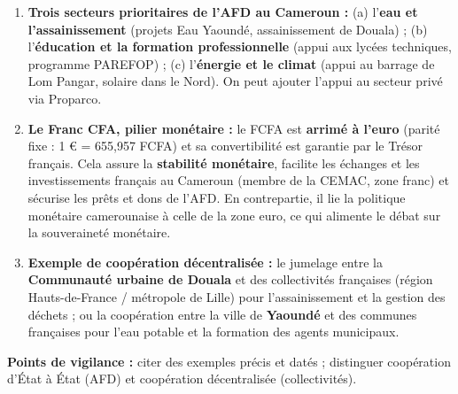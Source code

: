\documentclass[11pt]{article}
\begin{document}
\begin{corrige}
\begin{enumerate}
\item \textbf{Trois secteurs prioritaires de l'AFD au Cameroun :} (a) l'\textbf{eau et l'assainissement} (projets Eau Yaoundé, assainissement de Douala) ; (b) l'\textbf{éducation et la formation professionnelle} (appui aux lycées techniques, programme PAREFOP) ; (c) l'\textbf{énergie et le climat} (appui au barrage de Lom Pangar, solaire dans le Nord). On peut ajouter l'appui au secteur privé via Proparco.
\item \textbf{Le Franc CFA, pilier monétaire :} le FCFA est \textbf{arrimé à l'euro} (parité fixe : 1 \euro{} = 655,957 FCFA) et sa convertibilité est garantie par le Trésor français. Cela assure la \textbf{stabilité monétaire}, facilite les échanges et les investissements français au Cameroun (membre de la CEMAC, zone franc) et sécurise les prêts et dons de l'AFD. En contrepartie, il lie la politique monétaire camerounaise à celle de la zone euro, ce qui alimente le débat sur la souveraineté monétaire.
\item \textbf{Exemple de coopération décentralisée :} le jumelage entre la \textbf{Communauté urbaine de Douala} et des collectivités françaises (région Hauts-de-France / métropole de Lille) pour l'assainissement et la gestion des déchets ; ou la coopération entre la ville de \textbf{Yaoundé} et des communes françaises pour l'eau potable et la formation des agents municipaux.
\end{enumerate}
\textbf{Points de vigilance :} citer des exemples précis et datés ; distinguer coopération d'État à État (AFD) et coopération décentralisée (collectivités).
\end{corrige}
\end{document}
